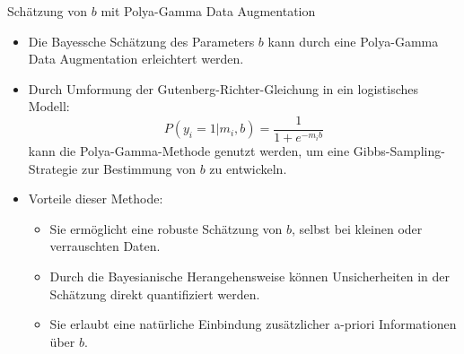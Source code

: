 \documentclass{beamer}
\begin{document}
	
	
	\begin{frame}{Schätzung von $b$ mit Polya-Gamma Data Augmentation}
		\begin{itemize}
			\item Die Bayessche Schätzung des Parameters $b$ kann durch eine Polya-Gamma Data Augmentation erleichtert werden.
			\item Durch Umformung der Gutenberg-Richter-Gleichung in ein logistisches Modell:
			\begin{equation}
				P(y_i = 1 | m_i, b) = \frac{1}{1 + e^{-m_i b}}
			\end{equation}
			kann die Polya-Gamma-Methode genutzt werden, um eine Gibbs-Sampling-Strategie zur Bestimmung von $b$ zu entwickeln.
			\item Vorteile dieser Methode:
			\begin{itemize}
				\item Sie ermöglicht eine robuste Schätzung von $b$, selbst bei kleinen oder verrauschten Daten.
				\item Durch die Bayesianische Herangehensweise können Unsicherheiten in der Schätzung direkt quantifiziert werden.
				\item Sie erlaubt eine natürliche Einbindung zusätzlicher a-priori Informationen über $b$.
			\end{itemize}
		\end{itemize}
	\end{frame}
	
\end{document}
